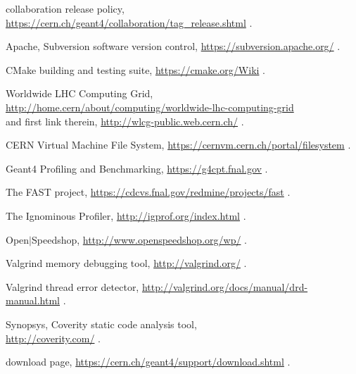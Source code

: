 %
%
 \Gfour{} collaboration release policy,
                \url{https://cern.ch/geant4/collaboration/tag\_release.shtml} .

 Apache, Subversion software version control,
                      \url{https://subversion.apache.org/} .

 CMake building and testing suite,
                        \url{https://cmake.org/Wiki} .

 Worldwide LHC Computing Grid, 
             \url{http://home.cern/about/computing/worldwide-lhc-computing-grid} \\
             and first link therein, 
             \url{http://wlcg-public.web.cern.ch/} .

 CERN Virtual Machine File System,
                   \url{https://cernvm.cern.ch/portal/filesystem} .
%
%

 Geant4 Profiling and Benchmarking,
                      \url{https://g4cpt.fnal.gov} .

 The FAST project,
                     \url{https://cdcvs.fnal.gov/redmine/projects/fast} .

 The Ignominous Profiler,
                       \url{http://igprof.org/index.html} .

 Open$\mid$Speedshop,
                    \url{http://www.openspeedshop.org/wp/} .

 Valgrind memory debugging tool, \url{http://valgrind.org/} .

 Valgrind thread error detector,
                 \url{http://valgrind.org/docs/manual/drd-manual.html} .

 Synopsys, Coverity static code analysis tool, \\
                      \url{http://coverity.com/} .

 \Gfour{} download page,
                    \url{https://cern.ch/geant4/support/download.shtml} .
~
